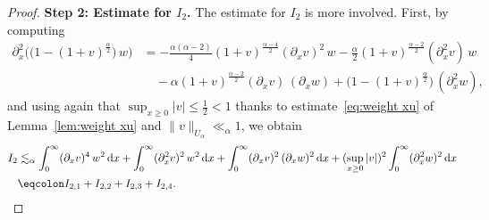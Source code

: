 \documentclass[reqno,12pt]{amsart}
\renewcommand{\d}{\ensuremath{\mathrm{d}}}
\renewcommand{\d}{\ensuremath{{\rm d}}}
\numberwithin{equation}{section}
\begin{document}
\begin{proof}
\noindent\textbf{Step 2: Estimate for $I_2$. }
The estimate for $I_2$ is more involved. First, by computing 
%
\begin{align*}
    \partial_x^2\big(\big(1-(1+v)^{\frac{\alpha}{2}}\big)\, w\big)
    &= 
    - \tfrac{\alpha (\alpha-2)}{4} (1+v)^{\frac{\alpha -4}{2}} (\partial_x v)^2 \, w - \tfrac{\alpha}{2} (1+v)^{\frac{\alpha -2}{2}} (\partial_x^2 v) \, w \\
    & \quad - 
    \alpha (1+v)^{\frac{\alpha -2}{2}} (\partial_x v) \, (\partial_x w) + \big(1-(1+v)^{\frac{\alpha}{2}}\big) \, (\partial_x^2 w), 
\end{align*}
%
and using again that $\sup_{x \geq 0} |v| \leq \frac{1}{2} < 1$ thanks to estimate~\eqref{eq:weight xu} of Lemma~\ref{lem:weight xu} and $\|v\|_{U_\alpha} \ll_\alpha 1$, we obtain
\begin{align}\nonumber
    I_2
    &\lesssim_\alpha
    \int_0^\infty (\partial_x v)^4\, w^2\, \d x
    +
    \int_0^\infty (\partial_x^2 v)^2\, w^2\, \d x
    +
    \int_0^\infty (\partial_x v)^2\, (\partial_x w)^2\, \d x
    +
    (\sup_{x\geq 0} |v|)^2 \int_0^\infty (\partial_x^2 w)^2\, \d x
    \\
    &\eqcolon
    I_{2,1}
    +
    I_{2,2}
    +
    I_{2,3}
    +
    I_{2,4}. \label{i2-split}
\end{align}
%

%
\bigskip
%


\end{proof}
\end{document}
